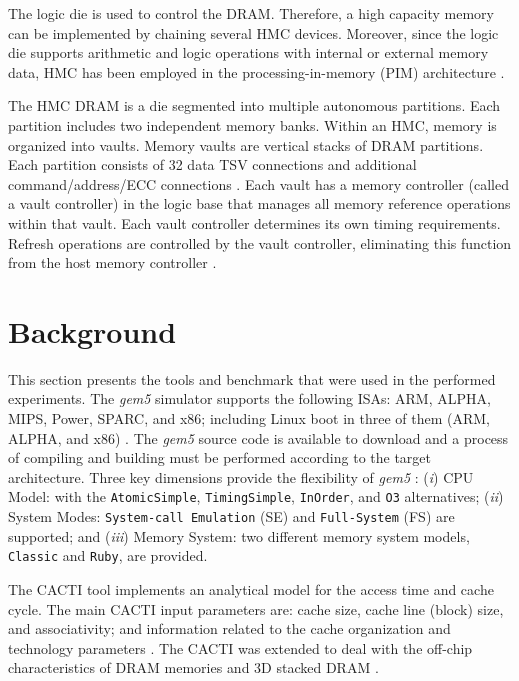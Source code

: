 \documentclass{sig-alternate-05-2015}
\begin{document}
The logic die is used to control the DRAM. Therefore, a high capacity memory can be implemented by chaining several HMC devices. Moreover, since the logic die supports arithmetic and logic operations with internal or external memory data, HMC has been employed in the processing-in-memory (PIM) architecture \cite{jeon2017cashmc}.

The HMC DRAM is a die segmented into multiple autonomous partitions. Each partition includes two independent memory banks. Within an HMC, memory is organized into vaults. Memory vaults are vertical stacks of DRAM partitions. Each partition consists of 32 data TSV connections and additional command/address/ECC connections \cite{jeddeloh2012HMC}. Each vault has a memory controller (called a vault controller) in the logic base that manages all memory reference operations within that vault. Each vault controller determines its own timing requirements. Refresh operations are controlled by the vault controller, eliminating this function from the host memory controller \cite{hmc2_1_Specification}.

\section{Background} \label{sec:Background}

This section presents the tools and benchmark that were used in the performed experiments. The \emph{gem5} simulator supports the following ISAs: ARM, ALPHA, MIPS, Power, SPARC, and x86; including Linux boot in three of them (ARM, ALPHA, and x86) \cite{binkert2011gem5}. The \emph{gem5} source code \cite{gem5:2017} is available to download and a process of compiling and building must be performed according to the target architecture. Three key dimensions provide the flexibility of \emph{gem5} \cite{binkert2011gem5}: (\emph{i}) CPU Model: with the \texttt{AtomicSimple}, \texttt{TimingSimple}, \texttt{InOrder}, and \texttt{O3} alternatives; (\emph{ii}) System Modes: \texttt{System-call Emulation} (SE) and \texttt{Full-System} (FS) are supported; and (\emph{iii}) Memory System: two different memory system models, \texttt{Classic} and \texttt{Ruby}, are provided.

The CACTI tool implements an analytical model for the access time and cache cycle. The main CACTI input parameters are: cache size, cache line (block) size, and associativity; and information related to the cache organization and technology parameters \cite{CACTI:2017}. The CACTI \cite{CACTI-github:2017} was extended to deal with the off-chip characteristics of DRAM memories \cite{jouppi2015cacti-IO} and 3D stacked DRAM \cite{chen2012cacti3DD}.
\end{document}
